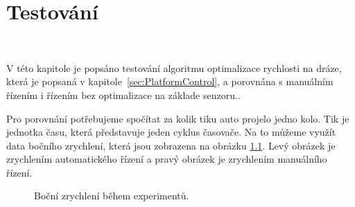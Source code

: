 \chapter{Testování}
\label{sec:Testing}
\vspace{-20pt}
\

V této kapitole je popsáno testování algoritmu optimalizace rychlosti na dráze,
která je popsaná v kapitole~\ref{sec:PlatformControl}, a porovnána s manuálním
řízením i řízením bez optimalizace na základe senzoru..

Pro porovnání potřebujeme spočítat za kolik tiku auto projelo jedno kolo. Tik je
jednotka času, která představuje jeden cyklus časovače. Na to můžeme využít data
bočního zrychlení, která jsou zobrazena na obrázku \ref{fig:Laps}. Levý obrázek je
zrychlením automatického řízení a pravý obrázek je zrychlením manuálního řízení.

\begin{figure}[!h]
    \centering
    \caption{Boční zrychlení během experimentů.}
    \label{fig:Laps}
\end{figure}

